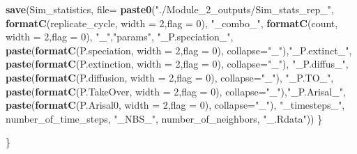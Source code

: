 \documentclass[]{book}
\newenvironment{Shaded}{\begin{snugshade}}{\end{snugshade}}
\newcommand{\KeywordTok}[1]{\textcolor[rgb]{0.13,0.29,0.53}{\textbf{{#1}}}}
\newcommand{\DataTypeTok}[1]{\textcolor[rgb]{0.13,0.29,0.53}{{#1}}}
\newcommand{\DecValTok}[1]{\textcolor[rgb]{0.00,0.00,0.81}{{#1}}}
\newcommand{\StringTok}[1]{\textcolor[rgb]{0.31,0.60,0.02}{{#1}}}
\newcommand{\NormalTok}[1]{{#1}}
\theoremstyle{definition}
\theoremstyle{definition}
\theoremstyle{remark}
\begin{document}
\begin{Shaded}
\begin{Highlighting}[]
{{    \KeywordTok{save}\NormalTok{(Sim_statistics, }\DataTypeTok{file=} \KeywordTok{paste0}\NormalTok{(}\StringTok{"./Module_2_outputs/Sim_stats_rep_"}\NormalTok{,}
                                      \KeywordTok{formatC}\NormalTok{(replicate_cycle, }\DataTypeTok{width =} \DecValTok{2}\NormalTok{,}\DataTypeTok{flag =} \DecValTok{0}\NormalTok{),}
                                      \StringTok{"_combo_"}\NormalTok{,}
                                      \KeywordTok{formatC}\NormalTok{(count, }\DataTypeTok{width =} \DecValTok{2}\NormalTok{,}\DataTypeTok{flag =} \DecValTok{0}\NormalTok{),}
                                      \StringTok{"_"}\NormalTok{,}\StringTok{"params"}\NormalTok{, }\StringTok{"_P.speciation_"}\NormalTok{,}
                                      \KeywordTok{paste}\NormalTok{(}\KeywordTok{formatC}\NormalTok{(P.speciation, }\DataTypeTok{width =} \DecValTok{2}\NormalTok{,}\DataTypeTok{flag =} \DecValTok{0}\NormalTok{), }\DataTypeTok{collapse=}\StringTok{"_"}\NormalTok{),}\StringTok{"_P.extinct_"}\NormalTok{,}
                                      \KeywordTok{paste}\NormalTok{(}\KeywordTok{formatC}\NormalTok{(P.extinction, }\DataTypeTok{width =} \DecValTok{2}\NormalTok{,}\DataTypeTok{flag =} \DecValTok{0}\NormalTok{), }\DataTypeTok{collapse=}\StringTok{"_"}\NormalTok{), }\StringTok{"_P.diffus_"}\NormalTok{,}
                                      \KeywordTok{paste}\NormalTok{(}\KeywordTok{formatC}\NormalTok{(P.diffusion, }\DataTypeTok{width =} \DecValTok{2}\NormalTok{,}\DataTypeTok{flag =} \DecValTok{0}\NormalTok{), }\DataTypeTok{collapse=}\StringTok{"_"}\NormalTok{), }\StringTok{"_P.TO_"}\NormalTok{,}
                                      \KeywordTok{paste}\NormalTok{(}\KeywordTok{formatC}\NormalTok{(P.TakeOver, }\DataTypeTok{width =} \DecValTok{2}\NormalTok{,}\DataTypeTok{flag =} \DecValTok{0}\NormalTok{), }\DataTypeTok{collapse=}\StringTok{"_"}\NormalTok{),}\StringTok{"_P.Arisal_"}\NormalTok{,}
                                      \KeywordTok{paste}\NormalTok{(}\KeywordTok{formatC}\NormalTok{(P.Arisal0, }\DataTypeTok{width =} \DecValTok{2}\NormalTok{,}\DataTypeTok{flag =} \DecValTok{0}\NormalTok{), }\DataTypeTok{collapse=}\StringTok{"_"}\NormalTok{),}
                                      \StringTok{"_timesteps_"}\NormalTok{, number_of_time_steps, }\StringTok{"_NBS_"}\NormalTok{, number_of_neighbors, }\StringTok{"_.Rdata"}\NormalTok{))}
\NormalTok{  \}}
  
\NormalTok{\}}

}}
\end{Highlighting}
\end{Shaded}
\end{document}
